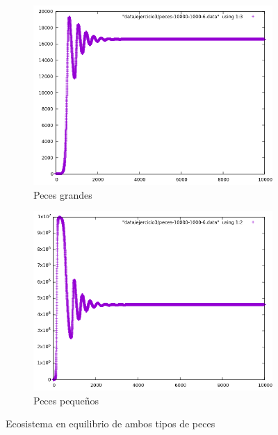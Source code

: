 \documentclass[12pt,a4paper]{article}
\begin{document}
\begin{figure}
	\centering
	\begin{subfigure}{.5\textwidth}
		\centering
		\includegraphics[width=1\linewidth]{./images/pecesGrandes2.png}
		\caption{Peces grandes}
		\label{fig:subPecesGrandes1}
	\end{subfigure}%
	\begin{subfigure}{.5\textwidth}
		\centering
		\includegraphics[width=1\linewidth]{./images/pecesPequenos2.png}
		\caption{Peces pequeños}
		\label{fig:subPecesPeque1}
	\end{subfigure}
	\caption{Ecosistema en equilibrio de ambos tipos de peces}
	\label{fig:ecosistema1}
\end{figure}
\end{document}

